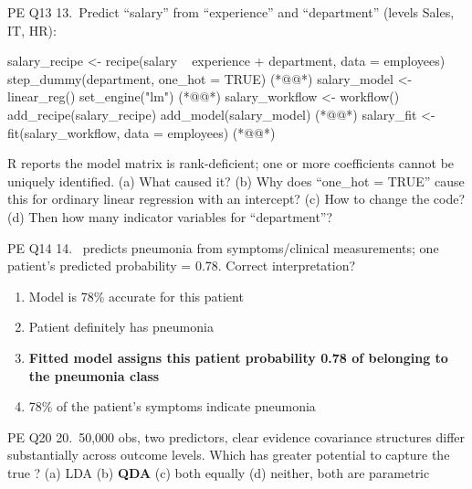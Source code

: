 \begin{qbox}{PE Q13}
13.~Predict ``salary'' from ``experience'' and ``department'' (levels Sales, IT, HR):
\begin{rcode}
salary_recipe <- recipe(salary ~ experience + department,
                        data = employees) %
  step_dummy(department, one_hot = TRUE)                (*@@*)
salary_model <- linear_reg() %
  set_engine("lm")                                      (*@@*)
salary_workflow <- workflow() %
  add_recipe(salary_recipe) %
  add_model(salary_model)                               (*@@*)
salary_fit <- fit(salary_workflow, data = employees)    (*@@*)
\end{rcode}
R reports the model matrix is rank-deficient; one or more coefficients cannot be uniquely identified.
(a) What caused it? (b) Why does ``one\_hot = TRUE'' cause this for ordinary linear regression with an intercept? (c) How to change the code? (d) Then how many indicator variables for ``department''?
\end{qbox}

\begin{qbox}{PE Q14}
14.~ predicts pneumonia from symptoms/clinical measurements; one patient's predicted probability = 0.78. Correct interpretation?
\begin{enumerate}[label=\alph*.]
\item Model is 78\% accurate for this patient
\item Patient definitely has pneumonia
\item {\color{keyc}\bfseries Fitted model assigns this patient probability 0.78 of belonging to the pneumonia class}
\item 78\% of the patient's symptoms indicate pneumonia
\end{enumerate}
\end{qbox}

\begin{qbox}{PE Q20}
20.~50,000 obs, two predictors, clear evidence covariance structures differ substantially across outcome levels. Which has greater potential to capture the true ?
(a) LDA \quad (b) {\color{keyc}\bfseries QDA} \quad (c) both equally \quad (d) neither, both are parametric
\end{qbox}

